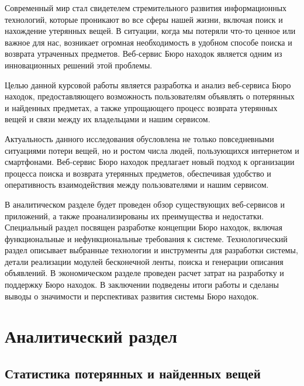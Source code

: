 \documentclass{mirea}
\begin{document}
	
% 
	
\addtocounter{page}{2}

\tableofcontents


Современный мир стал свидетелем стремительного развития информационных технологий, которые проникают во все сферы нашей жизни, включая поиск и нахождение утерянных вещей. В ситуации, когда мы потеряли что-то ценное или важное для нас, возникает огромная необходимость в удобном способе поиска и возврата утраченных предметов. Веб-сервис Бюро находок является одним из инновационных решений этой проблемы.

Целью данной курсовой работы является разработка и анализ веб-сер\-ви\-са Бюро находок, предоставляющего возможность пользователям объявлять о потерянных и найденных предметах, а также упрощающего процесс возврата утерянных вещей и связи между их владельцами и нашим сервисом.

Актуальность данного исследования обусловлена не только повседневными ситуациями потери вещей, но и ростом числа людей, пользующихся интернетом и смартфонами. Веб-сервис Бюро находок предлагает новый подход к организации процесса поиска и возврата утерянных предметов, обеспечивая удобство и оперативность взаимодействия между пользователями и нашим сервисом.

В аналитическом разделе будет проведен обзор существующих веб-сер\-ви\-сов и приложений, а также проанализированы их преимущества и недостатки. Специальный раздел посвящен разработке концепции Бюро находок, включая функциональные и нефункциональные требования к системе. Технологический раздел описывает выбранные технологии и инструменты для разработки системы, детали реализации модулей бесконечной ленты, поиска и генерации описания объявлений. В экономическом разделе проведен расчет затрат на разработку и поддержку Бюро находок. В заключении подведены итоги работы и сделаны выводы о значимости и перспективах развития системы Бюро находок.

\section{Аналитический раздел}

\subsection{Статистика потерянных и найденных вещей}
\end{document}
